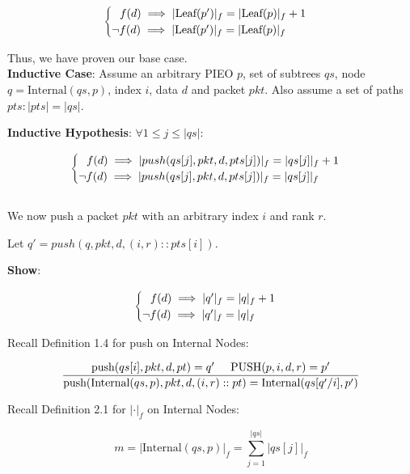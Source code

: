 \documentclass{amsart}
\begin{document}
$$\begin{cases}
    \hspace{0.25cm} \text{$f(d) \implies |\text{Leaf}(p')|_f = |\text{Leaf}(p)|_f + 1$}\\
    \text{$\neg f(d) \implies |\text{Leaf}(p')|_f = |\text{Leaf}(p)|_f$}
\end{cases}$$

Thus, we have proven our base case.\\[10pt]

\textbf{Inductive Case}: Assume an arbitrary PIEO $p$, set of subtrees $qs$, node $q = \text{Internal}(qs, p)$, index $i$, data $d$ and packet $pkt$.
Also assume a set of paths $pts : |pts| = |qs|$.\newline

\textbf{Inductive Hypothesis}:
$\forall 1 \leq j \leq |qs|:$

$$\begin{cases}
    \hspace{0.25cm} \text{$f(d) \implies |push(qs[j], pkt, d, pts[j])|_f = |qs[j]|_f + 1$}\\
    \text{$\neg f(d) \implies |push(qs[j], pkt, d, pts[j])|_f = |qs[j]|_f$}
\end{cases}$$\\[-5pt]

We now push a packet $pkt$ with an arbitrary index $i$ and rank $r$.\newline

Let $q' = push(q, pkt, d, (i, r) :: pts[i])$.\newline

\textbf{Show}: 

$$\begin{cases}
    \hspace{0.25cm} \text{$f(d) \implies |q'|_f = |q|_f + 1$}\\
    \text{$\neg f(d) \implies |q'|_f = |q|_f$}
\end{cases}$$

Recall Definition 1.4 for push on Internal Nodes:

$$\frac{\text{push}(qs[i], pkt, d, pt) = q' \hspace{0.5cm} \text{PUSH}(p, i, d, r) = p' }{\text{push}(\text{Internal}(qs, p), pkt, d, (i, r) :: pt) = \text{Internal}(qs[q'/i], p')}$$

Recall Definition 2.1 for $|\cdot|_f$ on Internal Nodes:

$$m = |\text{Internal}(qs, p)|_f = \sum_{j=1}^{|qs|} |qs[j]|_f$$
\end{document}
